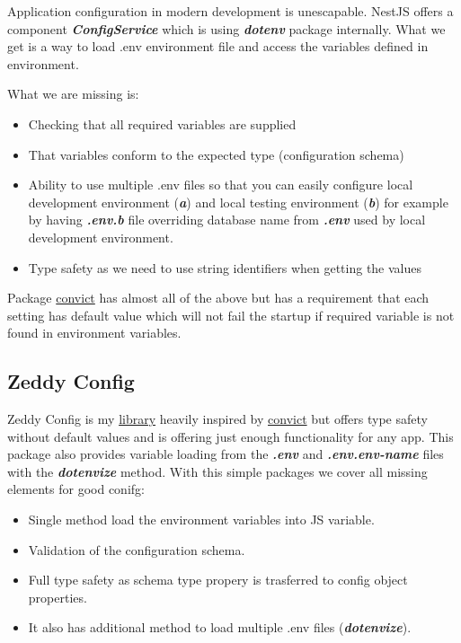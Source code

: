 \documentclass[lang=en,color=green]{elegantbook}
\newcommand{\bi}[1]{\textit{\textbf{#1}}}
\begin{document}
Application configuration in modern development is unescapable. NestJS
offers a component \bi{ConfigService} which is using \bi{dotenv} package internally.
What we get is a way to load .env environment file and access the variables
defined in environment.

What we are missing is:
\begin{itemize}
    \item Checking that all required variables are supplied
    \item That variables conform to the expected type (configuration schema)
    \item Ability to use multiple .env files so that you can easily configure
          local development environment (\bi{a}) and local testing environment (\bi{b})
          for example by having \bi{.env.b} file overriding database name from \bi{.env}
          used by local development environment.
    \item Type safety as we need to use string identifiers when getting the
          values
\end{itemize}

Package \href{https://www.npmjs.com/package/convict}{convict} has almost all
of the above but has a requirement that each setting has default value
which will not fail the startup if required variable is not found in
environment variables.

\subsection{Zeddy Config}
Zeddy Config is my \href{https://www.npmjs.com/package/zeddy-config}{library}
heavily inspired by \href{https://www.npmjs.com/package/convict}{convict} but offers
type safety without default values and is offering just enough functionality
for any app. This package also provides variable loading from the \bi{.env}
and \bi{.env.env-name} files with the \bi{dotenvize} method. With this simple
packages we cover all missing elements for good conifg:
\begin{itemize}
    \item Single method load the environment variables into JS variable.
    \item Validation of the configuration schema.
    \item Full type safety as schema type propery is trasferred to config object properties.
    \item It also has additional method to load multiple .env files (\bi{dotenvize}).
\end{itemize}
\end{document}
